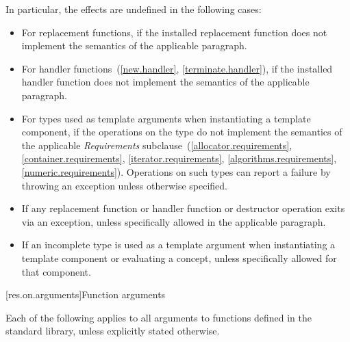 \pnum
In particular, the effects are undefined in the following cases:
\begin{itemize}
\item
For replacement functions, if the installed replacement function does not
implement the semantics of the applicable
\required
paragraph.
\item
For handler functions~(\ref{new.handler}, \ref{terminate.handler}),
if the installed handler function does not implement the semantics of the applicable
\required
paragraph.
\item
For types used as template arguments when instantiating a template component,
if the operations on the type do not implement the semantics of the applicable
\emph{Requirements}
subclause~(\ref{allocator.requirements}, \ref{container.requirements}, \ref{iterator.requirements},
\ref{algorithms.requirements}, \ref{numeric.requirements}).
Operations on such types can report a failure by throwing an exception
unless otherwise specified.
\item
If any replacement function or handler function or destructor operation exits via an exception,
unless specifically allowed
in the applicable
\required
paragraph.
\item
If an incomplete type is used as a template
argument when instantiating a template component or evaluating a concept, unless specifically
allowed for that component.
\end{itemize}

[res.on.arguments]{Function arguments}

\pnum
{}%
%
Each of the following applies to all arguments
%
to functions defined in the \Cpp{} standard library,%
unless explicitly stated otherwise.

